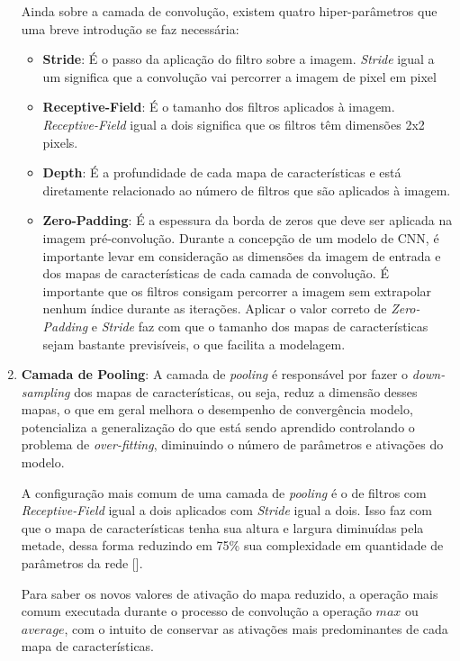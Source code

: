 \begin{enumerate}
            Ainda sobre a camada de convolução, existem quatro hiper-parâmetros que uma breve introdução se faz necessária:
            \begin{itemize}
                \item \textbf{Stride}: É o passo da aplicação do filtro sobre a imagem. \textit{Stride} igual a um significa que a convolução vai percorrer a imagem de pixel em pixel
                \item \textbf{Receptive-Field}: É o tamanho dos filtros aplicados à imagem. \textit{Receptive-Field} igual a dois significa que os filtros têm dimensões 2x2 pixels.
                \item \textbf{Depth}: É a profundidade de cada mapa de características e está diretamente relacionado ao número de filtros que são aplicados à imagem.
                \item \textbf{Zero-Padding}: É a espessura da borda de zeros que deve ser aplicada na imagem pré-convolução. Durante a concepção de um modelo de CNN, é importante levar em consideração as dimensões da imagem de entrada e dos mapas de características de cada camada de convolução. É importante que os filtros consigam percorrer a imagem sem extrapolar nenhum índice durante as iterações. Aplicar o valor correto de \textit{Zero-Padding} e \textit{Stride} faz com que o tamanho dos mapas de características sejam bastante previsíveis, o que facilita a modelagem.
            \end{itemize}
            
    \item \textbf{Camada de Pooling}:
            A camada de \textit{pooling} é responsável por fazer o \textit{down-sampling} dos mapas de características, ou seja, reduz a dimensão desses mapas, o que em geral melhora o desempenho de convergência modelo, potencializa a generalização do que está sendo aprendido controlando o problema de \textit{over-fitting}, diminuindo o número de parâmetros e ativações do modelo.
            
            A configuração mais comum de uma camada de \textit{pooling} é o de filtros com \textit{Receptive-Field} igual a dois aplicados com \textit{Stride} igual a dois. Isso faz com que o mapa de características tenha sua altura e largura diminuídas pela metade, dessa forma reduzindo em 75\% sua complexidade em quantidade de parâmetros da rede [].
            
            Para saber os novos valores de ativação do mapa reduzido, a operação mais comum executada durante o processo de convolução a operação $max$ ou $average$, com o intuito de conservar as ativações mais predominantes de cada mapa de características.
            

\end{enumerate}
